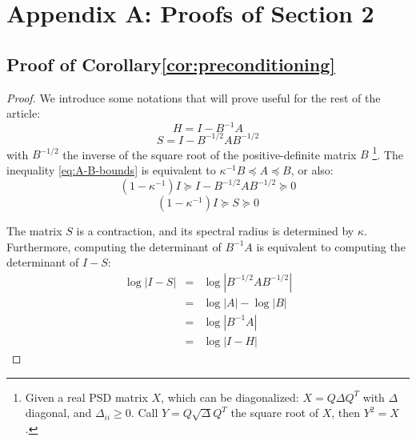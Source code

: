 
\section*{Appendix A: Proofs of Section 2}


\subsection{Proof of Corollary\ref{cor:preconditioning}}

\begin{proof} We introduce some notations that will prove useful
for the rest of the article: 
\[
H=I-B^{-1}A
\]
\[
S=I-B^{-1/2}AB^{-1/2}
\]
with $B^{-1/2}$ the inverse of the square root of the positive-definite
matrix $B$%
\footnote{Given a real PSD matrix $X$, which can be diagonalized: $X=Q\Delta Q^{T}$
with $\Delta$ diagonal, and $\Delta_{ii}\geq0$. Call $Y=Q\sqrt{\Delta}Q^{T}$
the square root of $X$, then $Y^{2}=X$.%
}. The inequality \ref{eq:A-B-bounds} is equivalent to $\kappa^{-1}B\preceq A\preceq B$,
or also: 
\[
\left(1-\kappa^{-1}\right)I\succeq I-B^{-1/2}AB^{-1/2}\succeq0
\]
\[
\left(1-\kappa^{-1}\right)I\succeq S\succeq0
\]


The matrix $S$ is a contraction, and its spectral radius is determined
by $\kappa$. Furthermore, computing the determinant of $B^{-1}A$
is equivalent to computing the determinant of $I-S$: 
\begin{eqnarray*}
\log\left|I-S\right| & = & \log\left|B^{-1/2}AB^{-1/2}\right|\\
 & = & \log\left|A\right|-\log\left|B\right|\\
 & = & \log\left|B^{-1}A\right|\\
 & = & \log\left|I-H\right|
\end{eqnarray*}



\end{proof}
